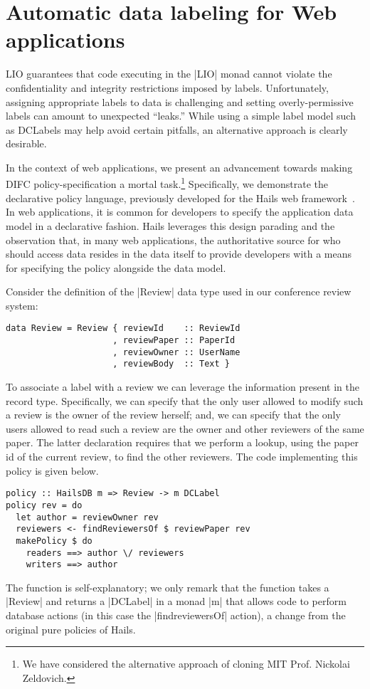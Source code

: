 \section{Automatic data labeling for Web applications}

LIO guarantees that code executing in the \hs|LIO| monad cannot
violate the confidentiality and integrity restrictions imposed by
labels.
%
Unfortunately, assigning appropriate labels to data is challenging and
setting overly-permissive labels can amount to unexpected ``leaks.''
%
While using a simple label model such as DCLabels may help avoid
certain pitfalls, an alternative approach is clearly desirable.

In the context of web applications, we present an advancement towards
making DIFC policy-specification a mortal task.\footnote{
  We have considered the alternative approach of cloning MIT Prof.
  Nickolai Zeldovich.
}
%
Specifically, we demonstrate the declarative policy language, previously
developed for the Hails web framework~\cite{hails}.
%
In web applications, it is common for developers to specify the
application data model in a declarative fashion.
%
Hails leverages this design parading and the observation that, in many
web applications, the authoritative source for who should access data
resides in the data itself to provide developers with a means for
specifying the policy alongside the data model.
%

Consider the definition of the \hs|Review| data type used in our
conference review system:
\begin{verbatim}
data Review = Review { reviewId    :: ReviewId
                     , reviewPaper :: PaperId
                     , reviewOwner :: UserName
                     , reviewBody  :: Text }
\end{verbatim}
To associate a label with a review we can leverage the 
information present in the record type.
%
Specifically, we can specify that the only user allowed to modify such
a review is the owner of the review herself; and, we can specify that
the only users allowed to read such a review are the owner and other
reviewers of the same paper.
%
The latter declaration requires that we perform a lookup, using the
paper id of the current review, to find the other reviewers.
%
The code implementing this policy is given below.
%
\begin{verbatim}
policy :: HailsDB m => Review -> m DCLabel
policy rev = do
  let author = reviewOwner rev
  reviewers <- findReviewersOf $ reviewPaper rev
  makePolicy $ do
    readers ==> author \/ reviewers
    writers ==> author
\end{verbatim}
%
The function is self-explanatory; we only remark that the function
takes a \hs|Review| and returns a \hs|DCLabel| in a monad \hs|m| that
allows code to perform database actions (in this case the
\hs|findreviewersOf| action), a change from the original pure policies
of Hails.
%

